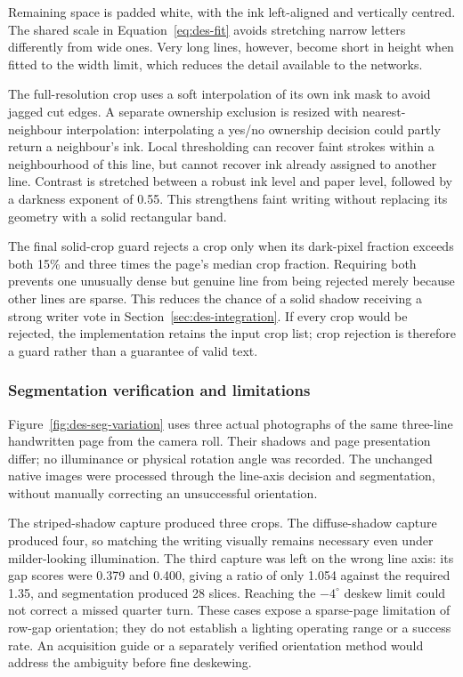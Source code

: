 Remaining space is padded white, with the ink left-aligned and vertically centred. The shared scale in Equation~\ref{eq:des-fit} avoids stretching narrow letters differently from wide ones. Very long lines, however, become short in height when fitted to the width limit, which reduces the detail available to the networks.~\cite[segment.py]{braunepipeline2026}

The full-resolution crop uses a soft interpolation of its own ink mask to avoid jagged cut edges. A separate ownership exclusion is resized with nearest-neighbour interpolation: interpolating a yes/no ownership decision could partly return a neighbour's ink. Local thresholding can recover faint strokes within a neighbourhood of this line, but cannot recover ink already assigned to another line. Contrast is stretched between a robust ink level and paper level, followed by a darkness exponent of 0.55. This strengthens faint writing without replacing its geometry with a solid rectangular band.~\cite[segment.py]{braunepipeline2026}

The final solid-crop guard rejects a crop only when its dark-pixel fraction exceeds both 15\% and three times the page's median crop fraction. Requiring both prevents one unusually dense but genuine line from being rejected merely because other lines are sparse. This reduces the chance of a solid shadow receiving a strong writer vote in Section~\ref{sec:des-integration}. If every crop would be rejected, the implementation retains the input crop list; crop rejection is therefore a guard rather than a guarantee of valid text.~\cite[segment.py]{braunepipeline2026}

\subsubsection{Segmentation verification and limitations}
\label{sec:des-segverify}
Figure~\ref{fig:des-seg-variation} uses three actual photographs of the same three-line handwritten page from the camera roll. Their shadows and page presentation differ; no illuminance or physical rotation angle was recorded. The unchanged native images were processed through the line-axis decision and segmentation, without manually correcting an unsuccessful orientation.~\cite[segment.py]{braunepipeline2026}


The striped-shadow capture produced three crops. The diffuse-shadow capture produced four, so matching the writing visually remains necessary even under milder-looking illumination. The third capture was left on the wrong line axis: its gap scores were 0.379 and 0.400, giving a ratio of only 1.054 against the required 1.35, and segmentation produced 28 slices. Reaching the $-4^\circ$ deskew limit could not correct a missed quarter turn. These cases expose a sparse-page limitation of row-gap orientation; they do not establish a lighting operating range or a success rate. An acquisition guide or a separately verified orientation method would address the ambiguity before fine deskewing.~\cite[segment.py]{braunepipeline2026}

